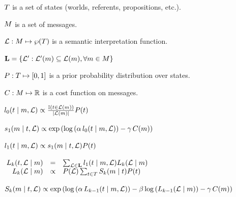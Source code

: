 \documentclass{article}
\begin{document}
\begin{examples}
\item
  \begin{examples}
  \item $\States$ is a set of states (worlds, referents, propositions, etc.).
  \item $\Messages$ is a set of messages.
  \item $\Lex: \Messages \mapsto \wp(\States)$ is a semantic interpretation function.
  \item $\LexSet = \set{\Lex' : \Lex'(\msg) \subseteq \Lex(\msg), \forall \msg \in \Messages}$
  \item $\Prior : \States \mapsto [0,1]$ is a prior probability
    distribution over states.    
  \item $\Costs : \Messages \mapsto \Reals$ is a cost function on messages.
  \end{examples}


\item\label{l0} $\listenerZero(\state \given \msg, \Lex) \propto 
  \frac{\mathbb{I}(\state \in \Lex(\msg))}{|\Lex(\msg)|}
  \Prior(\state)$

\item\label{s1} $\speakerOne(\msg \given \state, \Lex) \propto
  \exp
  \left(
    \log\left(\alpha\,\listenerZero(\state \given \msg, \Lex) \right)
    - 
    \gamma\,\Costs(\msg)
  \right)$

\item\label{l1} $\listenerOne(\state \given \msg, \Lex) \propto 
  \speakerOne(\msg \given \state, \Lex)
  \Prior(\state)$

\item\label{Lk}%
  \setlength{\arraycolsep}{2pt}%
  $\mspace{-4mu}\begin{array}[t]{r c l}
  \ListenerK(\state, \Lex \given \msg) 
  &=&
  \sum_{\Lex \in \LexSet} \listenerOne(\state \given \msg, \Lex) \ListenerK(\Lex \given \msg) 
  \\
  \ListenerK(\Lex \given \msg) 
  &\propto& 
  \Prior(\Lex) \sum_{\state\in\States} \SpeakerK(\msg \given \state)\Prior(\state)
  \end{array}$

\item\label{Sk}
  $\SpeakerK(\msg \given \state, \Lex) \propto 
  \exp
  \left(
    \log
    \left(\alpha\,\ListenerK[k-1](\state \given \msg, \Lex)\right)
    - 
    \beta \log\left(\ListenerK[k-1](\Lex\given\msg)\right)
    -
    \gamma\,\Costs(\msg)
  \right)$
\end{examples}
\end{document}
